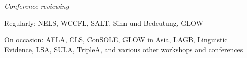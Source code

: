 \documentclass[12pt]{article}
\begin{document}
\bigskip%




 
 
 
  








\noindent\emph{Conference reviewing\vspace{0.05in}}
 
 
 \ind
Regularly: NELS, WCCFL, SALT, Sinn und Bedeutung, GLOW
 
 \ind
 On occasion: AFLA, CLS, ConSOLE, GLOW in Asia, LAGB, Linguistic Evidence, LSA, SULA, TripleA, and various other workshops and conferences
 
 
 
 


 





%
\end{document}
